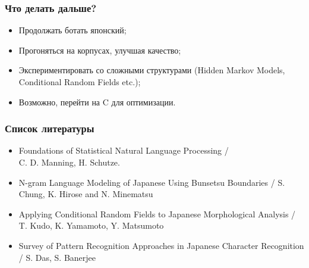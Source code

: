\documentclass[14pt]{beamer}
\begin{document}

\begin{frame}
\frametitle{Что делать дальше?}
\begin{itemize}
  \item Продолжать ботать японский;
  \item Прогоняться на корпусах, улучшая качество;
  \item Экспериментировать со сложными структурами (Hidden Markov Models, Conditional Random Fields etc.);
  \item Возможно, перейти на C для оптимизации.
\end{itemize}
\end{frame}

\begin{frame}
\frametitle{Список литературы}
\footnotesize{
\begin{itemize}
  \item Foundations of Statistical Natural Language Processing / \\C. D. Manning, H. Schutze.
  \item N-gram Language Modeling of Japanese Using Bunsetsu Boundaries / S. Chung, K. Hirose and N. Minematsu 
  \item Applying Conditional Random Fields to Japanese Morphological Analysis / T. Kudo, K. Yamamoto, Y. Matsumoto
  \item Survey of Pattern Recognition Approaches in Japanese Character Recognition / S. Das, S. Banerjee
\end{itemize}}
\end{frame}


\begin{frame}

\center{\huge %
Спасибо!
}

\end{frame}
\end{document}
